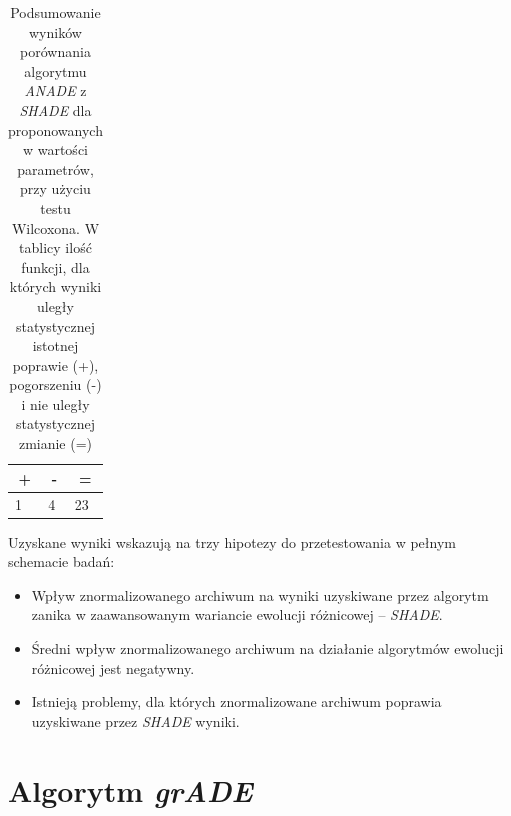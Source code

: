 \documentclass[12pt,a4paper]{report}
\begin{document}
{{{{{{\begin{table}[h]
\centering
\caption{Podsumowanie wyników porównania algorytmu \emph{ANADE} z \emph{SHADE} dla proponowanych w \cite{SHADE} wartości parametrów, przy użyciu testu Wilcoxona. W tablicy ilość funkcji, dla których wyniki uległy statystycznej istotnej poprawie (+), pogorszeniu (-) i nie uległy statystycznej zmianie (=)}
\label{Eksp3short}
\begin{tabular}{|l|l|l|}
\hline
\multicolumn{1}{|c|}{{\bf +}} & \multicolumn{1}{c|}{{\bf -}} & \multicolumn{1}{c|}{{\bf =}} \\ \hline
1       & 4       & 23      \\ \hline
\end{tabular}
\end{table}

\par{
Uzyskane wyniki wskazują na trzy hipotezy do przetestowania w pełnym schemacie badań:
\begin{itemize}
\item Wpływ znormalizowanego archiwum na wyniki uzyskiwane przez algorytm zanika w zaawansowanym wariancie ewolucji różnicowej -- \emph{SHADE}.
\item Średni wpływ znormalizowanego archiwum na działanie algorytmów ewolucji różnicowej jest negatywny.
\item Istnieją problemy, dla których znormalizowane archiwum poprawia uzyskiwane przez \emph{SHADE} wyniki.
\end{itemize}
}

\section{Algorytm \emph{grADE}}
}}}}}}
\end{document}
